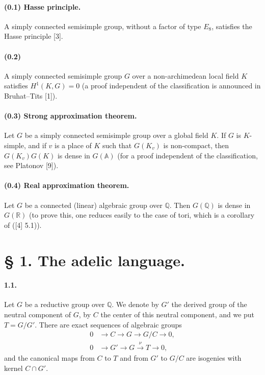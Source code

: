 \documentclass[10pt]{article}
\newcommand{\A}{\mathbb A}
\newcommand{\Q}{\mathbb Q}
\newcommand{\R}{\mathbb R}
\begin{document}
\paragraph{(0.1) Hasse principle.} A simply connected semisimple group, without a factor of type $E_8$, satisfies the Hasse principle [3].

\paragraph{(0.2)} A simply connected semisimple group $G$ over a non-archimedean local field $K$ satisfies $H^1(K,G)=0$ (a proof independent of the classification is announced in Bruhat--Tits [1]).

\paragraph{(0.3) Strong approximation theorem.} Let $G$ be a simply connected semisimple group over a global field $K$. If $G$ is $K$-simple, and if $v$ is a place of $K$ such that $G(K_v)$ is non-compact, then $G(K_v)G(K)$ is dense in $G(\A)$ (for a proof independent of the classification, see Platonov [9]).

\paragraph{(0.4) Real approximation theorem.} Let $G$ be a connected (linear) algebraic group over $\Q$. Then $G(\Q)$ is dense in $G(\R)$ (to prove this, one reduces easily to the case of tori, which is a corollary of ([4] 5.1)).

\section*{§ 1. The adelic language.}

\paragraph{1.1.} Let $G$ be a reductive group over $\Q$. We denote by $G'$ the derived group of the neutral component of $G$, by $C$ the center of this neutral component, and we put $T=G/G'$. There are exact sequences of algebraic groups
\begin{align}
0&\longrightarrow C\longrightarrow G\longrightarrow G/C\longrightarrow0,\tag{1.1.1}\\
0&\longrightarrow G'\longrightarrow G\xrightarrow{\nu}T\longrightarrow0,\tag{1.1.2}
\end{align}
and the canonical maps from $C$ to $T$ and from $G'$ to $G/C$ are isogenies with kernel $C\cap G'$.
\end{document}
